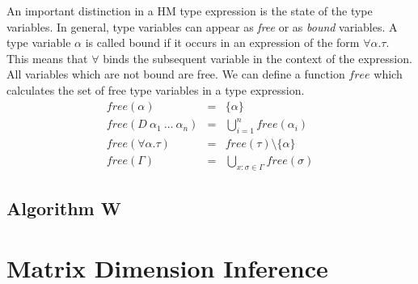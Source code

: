 An important distinction in a HM type expression is the state of the type variables.
In general, type variables can appear as \emph{free} or as \emph{bound} variables.
A type variable $\alpha$ is called bound if it occurs in an expression of the form $\forall \alpha. \tau$.
This means that $\forall$ binds the subsequent variable in the context of the expression.
All variables which are not bound are free.
We can define a function $free$ which calculates the set of free type variables in a type expression.
\begin{eqnarray*}
free(\alpha) &=& \{\alpha\}\\
free(D\ \alpha_1\ \ldots\ \alpha_n) &=& \bigcup_{i=1}^n free(\alpha_i)\\
free(\forall \alpha. \tau) &=& free(\tau) \setminus \{\alpha\}\\
free(\Gamma) &=& \bigcup_{x:\sigma \in \Gamma} free(\sigma)
\end{eqnarray*}

\subsection{Algorithm W}

\begin{prooftree}
\end{prooftree}

\begin{prooftree}
\end{prooftree}

\begin{prooftree}
\end{prooftree}

\begin{prooftree}
\end{prooftree}

\section{Matrix Dimension Inference}